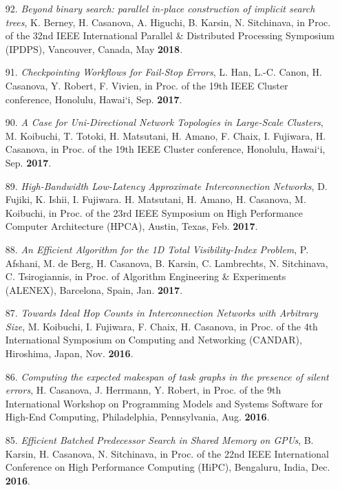 \begin{enumerate}
\item [92.] {\it Beyond binary search: parallel in-place construction of implicit search trees},
K. Berney, H. Casanova, A. Higuchi, B. Karsin, N. Sitchinava,
in Proc. of the 32nd IEEE International Parallel \& Distributed Processing Symposium (IPDPS), Vancouver, Canada, May {\bf 2018}.


\item [91.] {\it Checkpointing Workflows for Fail-Stop Errors},
L. Han, L.-C. Canon, H. Casanova, Y. Robert, F. Vivien, 
in Proc. of the 19th IEEE Cluster conference, Honolulu, Hawai`i, Sep. {\bf 2017}. 

\item [90.] {\it A Case for Uni-Directional Network Topologies in Large-Scale Clusters}, 
M. Koibuchi, T. Totoki, H. Matsutani, H. Amano, F. Chaix, I. Fujiwara, H. Casanova, 
in Proc. of the 19th IEEE Cluster conference, Honolulu, Hawai`i, Sep. {\bf 2017}. 

\item [89.] {\it High-Bandwidth Low-Latency Approximate Interconnection
Networks}, D. Fujiki, K. Ishii, I. Fujiwara. H. Matsutani, H. Amano, H.
Casanova, M. Koibuchi, in Proc. of the 23rd IEEE Symposium on High
Performance Computer Architecture (HPCA), Austin, Texas, Feb. {\bf 2017}.

\item [88.] {\it An Efficient Algorithm for the 1D Total Visibility-Index
Problem}, P. Afshani, M. de Berg, H. Casanova, B. Karsin, C. Lambrechts, N.
Sitchinava, C. Tsirogiannis, in Proc. of Algorithm Engineering \&
Experiments (ALENEX), Barcelona, Spain, Jan. {\bf 2017}.

\item [87.] {\it  Towards Ideal Hop Counts in Interconnection Networks with
Arbitrary Size}, M. Koibuchi, I. Fujiwara, F. Chaix, H. Casanova, in Proc.
of the 4th International Symposium on Computing and Networking (CANDAR),
Hiroshima, Japan, Nov.  {\bf 2016}.

\item [86.] {\it Computing the expected makespan of task graphs in the presence of silent errors},
H. Casanova, J. Herrmann, Y. Robert,
in Proc. of the 9th International Workshop on Programming Models and Systems Software for High-End Computing, Philadelphia, Pennsylvania, Aug. {\bf 2016}.


\item [85.] {\it Efficient Batched Predecessor Search in Shared Memory on GPUs},
B. Karsin, H. Casanova, N. Sitchinava, in Proc. of 
the 22nd IEEE International Conference on High Performance Computing (HiPC),
Bengaluru, India, Dec. {\bf 2016}. 


\end{enumerate}
